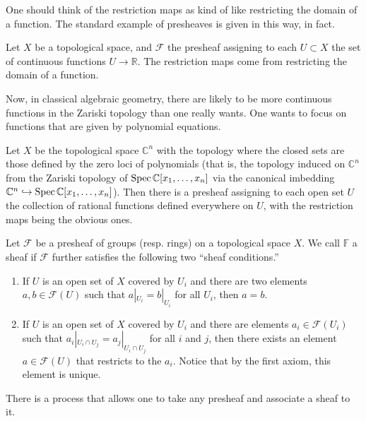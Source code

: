 One should think of the restriction maps as kind of like
restricting the
domain of a function.
The standard example of presheaves is given in this way, in
fact.
\begin{example} 
Let $X$ be a topological space, and $\mathcal{F}$ the presheaf
assigning to
each $U \subset X$ the set of continuous functions $U \to
\mathbb{R}$. The
restriction maps come from restricting the domain of a function.\end{example} 

Now, in classical algebraic geometry, there are likely to be
more
continuous functions in the Zariski topology than one really
wants. One wants
to focus on functions that are given by polynomial equations.

\begin{example} 
Let $X$ be the topological space $\mathbb{C}^n$ with the
topology where the
closed sets are those defined by the zero loci of polynomials
(that is, the
topology induced on $\mathbb{C}^n$ from the Zariski topology of
$\operatorname{Spec}
\mathbb{C}[x_1, \dots, x_n]$ via the canonical imbedding
$\mathbb{C}^n
\hookrightarrow \operatorname{Spec} \mathbb{C}[x_1, \dots, x_n]$). Then there
is a presheaf
assigning to each open set $U$ the collection of rational
functions defined
everywhere on $U$, with the restriction maps being the obvious
ones.
\end{example} 

\begin{definition} Let $\mathcal{F}$ be a presheaf of groups
(resp. rings) on a topological space $X$. We call $\mathbb{F}$ a
sheaf if $\mathcal{F}$ further satisfies the following two
``sheaf conditions.''\begin{enumerate}
\item{If $U$ is an open set of $X$ covered by $U_i$ and there
are two elements $a,b\in \mathcal{F}(U)$ such that
$a|_{U_i}=b|_{U_i}$ for all $U_i$, then $a=b$.}
\item{If $U$ is an open set of $X$ covered by $U_i$ and there
are elements $a_i\in \mathcal{F}(U_i)$ such that $a_i|_{U_i\cap
U_j} = a_j|_{U_i\cap U_j}$ for all $i$ and $j$, then there
exists an element $a\in\mathcal{F}(U)$ that restricts to the
$a_i$. Notice that by the first axiom, this element is unique.}
\end{enumerate}
\end{definition}

There is a process that allows one to take any presheaf and
associate a sheaf to it.

